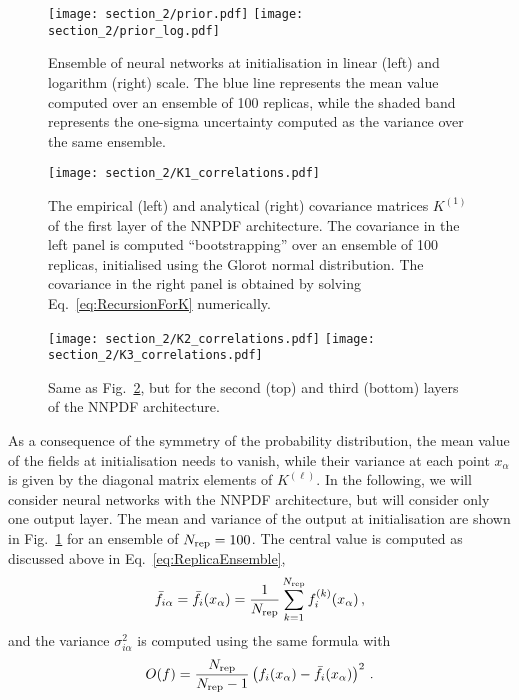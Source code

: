 \begin{figure}[t]
    \centering
    \texttt{[image: section\_2/prior.pdf]}
    \texttt{[image: section\_2/prior\_log.pdf]}
    \caption{Ensemble of neural networks at initialisation in linear (left) and logarithm (right) scale.
    The blue line represents the mean value computed over an ensemble of 100 replicas, while the
    shaded band represents the one-sigma uncertainty computed as the variance over the same ensemble.}        
    \label{fig:prior} 
\end{figure}
\begin{figure}[t]
    \centering
    \texttt{[image: section\_2/K1\_correlations.pdf]}
    \caption{The empirical (left) and analytical (right) covariance matrices $K^{(1)}$ of the first layer
    of the NNPDF architecture. The covariance in the left panel is computed ``bootstrapping'' over an
    ensemble of 100 replicas, initialised using the Glorot normal distribution. The covariance in the right
    panel is obtained by solving Eq.~\eqref{eq:RecursionForK} numerically.
    \label{Fig:KRecursionOne}
    }
\end{figure}

\begin{figure}[t]
    \centering
    \texttt{[image: section\_2/K2\_correlations.pdf]}
    \hspace{0.5cm}
    \texttt{[image: section\_2/K3\_correlations.pdf]}
    \caption{Same as Fig.~\ref{Fig:KRecursionOne}, but for the second (top) and
    third (bottom) layers of the NNPDF architecture.}
    \label{Fig:KRecursionTwo}
\end{figure}


As a consequence of the symmetry of the probability distribution, the mean value
of the fields at initialisation needs to vanish, while their variance at each
point $x_\alpha$ is given by the diagonal matrix elements of $K^{(\ell)}$. In
the following, we will consider neural networks with the NNPDF architecture, but
will consider only one output layer. The mean and variance of the output at
initialisation are shown in Fig.~\ref{fig:prior} for an ensemble of
$N_{\rm rep}=100$. The central value is computed as discussed above in
Eq.~\eqref{eq:ReplicaEnsemble},
\begin{align}
    \label{eq:MeanValAtInit}
    \bar{f}_{i\alpha} = \bar{f}_{i}(x_\alpha) = \frac{1}{N_{\rm rep}} \sum_{k=1}^{N_{\rm rep}} f^{(k)}_i(x_\alpha)\, ,
\end{align}
and the variance $\sigma^2_{i\alpha}$ is computed using the same formula with
\begin{align}
    \label{eq:VarAtInit}
    O(f) = \frac{N_{\rm rep}}{N_{\rm rep}-1} \left(f_i(x_\alpha) - \bar{f}_{i}(x_\alpha)\right)^2\, .
\end{align}

\FloatBarrier
